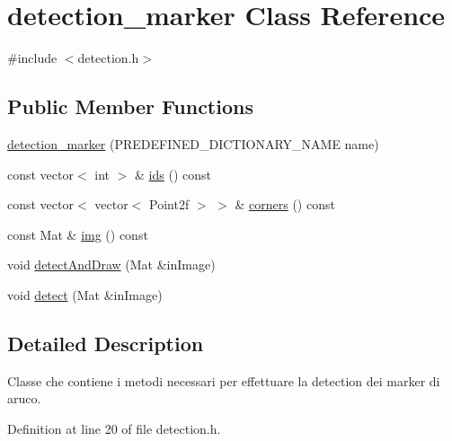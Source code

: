 \hypertarget{classdetection__marker}{\section{detection\+\_\+marker Class Reference}
\label{classdetection__marker}
}


{\ttfamily \#include $<$detection.\+h$>$}

\subsection*{Public Member Functions}
\begin{DoxyCompactItemize}
\item 
\hyperlink{classdetection__marker_a78703d9cfece4550684a3f6e0dfd659b}{detection\+\_\+marker} (P\+R\+E\+D\+E\+F\+I\+N\+E\+D\+\_\+\+D\+I\+C\+T\+I\+O\+N\+A\+R\+Y\+\_\+\+N\+A\+M\+E name)
\item 
const vector$<$ int $>$ \& \hyperlink{classdetection__marker_a486d89e7f7008d87a1c3c26c89ad3b74}{ids} () const 
\item 
const vector$<$ vector$<$ Point2f $>$ $>$ \& \hyperlink{classdetection__marker_a243c4a54a4b9d9c084672660e5d47f39}{corners} () const 
\item 
const Mat \& \hyperlink{classdetection__marker_a770b0b3075bf960621006f7f939b9757}{img} () const 
\item 
void \hyperlink{classdetection__marker_a08cd89907df009bce97bb5a6561074e6}{detect\+And\+Draw} (Mat \&in\+Image)
\item 
void \hyperlink{classdetection__marker_a4149fb9467f5cc15b1086c548821d925}{detect} (Mat \&in\+Image)
\end{DoxyCompactItemize}


\subsection{Detailed Description}
Classe che contiene i metodi necessari per effettuare la detection dei marker di aruco. 

Definition at line 20 of file detection.\+h.



